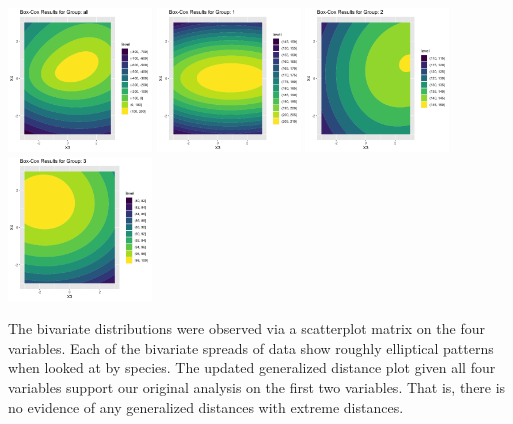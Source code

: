 \begin{center}
	\includegraphics[width=1.5in]{II_all_bxcx.png}
	\includegraphics[width=1.5in]{II_1_bxcx.png}
	\includegraphics[width=1.5in]{II_2_bxcx.png}
	\includegraphics[width=1.5in]{II_3_bxcx.png}
\end{center}

	The bivariate distributions were observed via a scatterplot matrix on the four variables. Each of the bivariate spreads of data show roughly elliptical patterns when looked at by species. The updated generalized distance plot given all four variables support our original analysis on the first two variables. That is, there is no evidence of any generalized distances with extreme distances.
	
